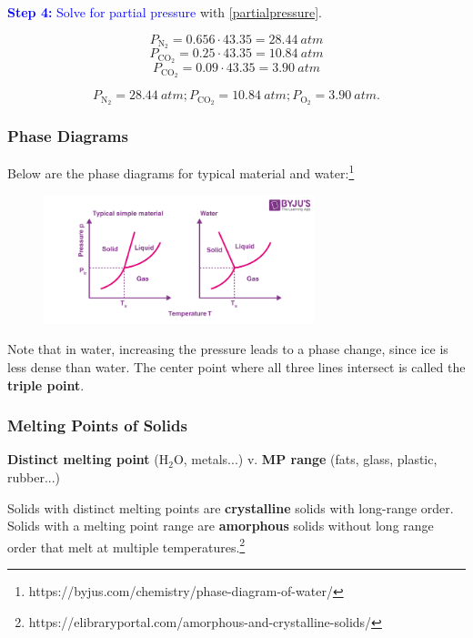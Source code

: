 \documentclass[a4paper, 12pt]{article}
\begin{document}
\textcolor{blue}{\textbf{Step 4:} Solve for partial pressure} with \ref{partialpressure}.

$$P_{\text{N}_2} = 0.656 \cdot 43.35 = 28.44 \: atm$$
$$P_{\text{CO}_2} = 0.25 \cdot 43.35 = 10.84 \: atm$$
$$P_{\text{CO}_2} = 0.09 \cdot 43.35 = 3.90 \: atm$$

$$\boxed{P_{\text{N}_2} = 28.44 \: atm; P_{\text{CO}_2} = 10.84 \: atm; P_{\text{O}_2} = 3.90 \: atm.}$$

\subsubsection*{Phase Diagrams}
Below are the phase diagrams for typical material and water:\footnote{https://byjus.com/chemistry/phase-diagram-of-water/}

\begin{figure}[H]
\centering
\includegraphics[width=0.7\textwidth]{phasediag.png}
\end{figure}

Note that in water, increasing the pressure leads to a phase change, since ice is less dense than water. The center point where all three lines intersect is called the \textbf{triple point}.

\subsubsection*{Melting Points of Solids}
\textbf{Distinct melting point} (H$_2$O, metals...) v. \textbf{MP range} (fats, glass, plastic, rubber...)

Solids with distinct melting points are \textbf{crystalline} solids with long-range order. Solids with a melting point range are \textbf{amorphous} solids without long range order that melt at multiple temperatures.\footnote{https://elibraryportal.com/amorphous-and-crystalline-solids/}
\end{document}
